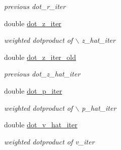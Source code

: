 \begin{CompactItemize}
\begin{CompactList}\small\item\em previous dot\_\-r\_\-iter \item\end{CompactList}\item 
\hypertarget{structinfsft__adjoint__plan_d854541f2e09bc978461fff1c323b2a5}{
double \hyperlink{structinfsft__adjoint__plan_d854541f2e09bc978461fff1c323b2a5}{dot\_\-z\_\-iter}}
\label{structinfsft__adjoint__plan_d854541f2e09bc978461fff1c323b2a5}

\begin{CompactList}\small\item\em weighted dotproduct of $\backslash$ z\_\-hat\_\-iter \item\end{CompactList}\item 
\hypertarget{structinfsft__adjoint__plan_681a3587b2e42a24f03bac812eb7a60e}{
double \hyperlink{structinfsft__adjoint__plan_681a3587b2e42a24f03bac812eb7a60e}{dot\_\-z\_\-iter\_\-old}}
\label{structinfsft__adjoint__plan_681a3587b2e42a24f03bac812eb7a60e}

\begin{CompactList}\small\item\em previous dot\_\-z\_\-hat\_\-iter \item\end{CompactList}\item 
\hypertarget{structinfsft__adjoint__plan_108504616c4e19b53638a80710f9308c}{
double \hyperlink{structinfsft__adjoint__plan_108504616c4e19b53638a80710f9308c}{dot\_\-p\_\-iter}}
\label{structinfsft__adjoint__plan_108504616c4e19b53638a80710f9308c}

\begin{CompactList}\small\item\em weighted dotproduct of $\backslash$ p\_\-hat\_\-iter \item\end{CompactList}\item 
\hypertarget{structinfsft__adjoint__plan_990b893dd142cbc3ade6436bdd603e59}{
double \hyperlink{structinfsft__adjoint__plan_990b893dd142cbc3ade6436bdd603e59}{dot\_\-v\_\-hat\_\-iter}}
\label{structinfsft__adjoint__plan_990b893dd142cbc3ade6436bdd603e59}

\begin{CompactList}\small\item\em weighted dotproduct of v\_\-iter \item\end{CompactList}\end{CompactItemize}


